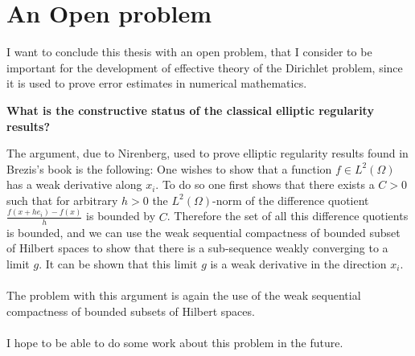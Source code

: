 \documentclass[11pt,a4paper,leqno]{report}
\numberwithin{equation}{chapter}
\begin{document}
\section{An Open problem}
I want to conclude this thesis with an open problem, that I consider to be important for the development of effective theory of the Dirichlet problem, since it is used to prove error estimates in numerical mathematics. 
\begin{center}
\textbf{What is the constructive status of the classical elliptic regularity results?}
\end{center}
The argument, due to Nirenberg, used to prove elliptic regularity results found in Brezis's book is the following: One wishes to show that a function $f\in L^2(\Omega)$ has a weak derivative along $x_i$. To do so one first shows that there exists a $C>0$ such that for arbitrary $h>0$ the $L^2(\Omega)$-norm of the difference quotient $\frac{f(x+he_i)-f(x)}{h}$ is bounded by $C$. Therefore the set of all this difference quotients is bounded, and we can use the weak sequential compactness of bounded subset of Hilbert spaces to show that there is a sub-sequence weakly converging to a limit $g$. It can be shown that this limit $g$ is a weak derivative in the direction $x_i$.
\\
\\
The problem with this argument is again the use of the weak sequential compactness of bounded subsets of Hilbert spaces.\\
\\
I hope to be able to do some work about this problem in the future.
\end{document}

